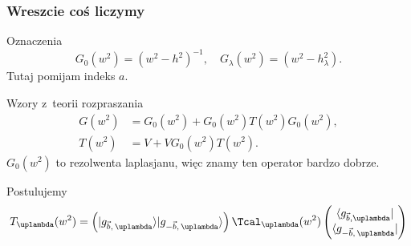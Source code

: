 \documentclass[10pt,t]{beamer}
\begin{document}
\begin{frame}
  \frametitle{Wreszcie coś liczymy}


  Oznaczenia
  \begin{equation}
    \label{eq:Efekt-Casimira-26}
    G_{ 0 }( w^{ 2 } ) = ( w^{ 2 } - h^{ 2 } )^{ -1 }, \quad
    G_{ \lambda }( w^{ 2 } ) = ( w^{ 2 } - h_{ \lambda }^{ 2 } ).
  \end{equation}
  Tutaj pomijam indeks $a$.


  Wzory z~teorii rozpraszania
  \begin{align}
    \label{eq:Efekt-Casimira-27-A}
    G( w^{ 2 } )
    &=
      G_{ 0 }( w^{ 2 } ) + G_{ 0 }( w^{ 2 } ) T( w^{ 2 } ) G_{ 0 }( w^{ 2 } ), \\
    \label{eq:Efekt-Casimira-27-B}
    T( w^{2 } ) &= V + V G_{ 0 }( w^{ 2 } ) T( w^{ 2 } ).
  \end{align}
  $G_{ 0 }( w^{ 2 } )$ to rezolwenta laplasjanu, więc znamy ten operator
  bardzo dobrze.

  Postulujemy
  \begin{equation}
    \label{eq:Efekt-Casimira-28}
    T_{ \lambda }( w^{ 2 } ) =
    \left( | g_{ \vecb,\, \lambda } \rangle | g_{ -\vecb,\, \lambda } \rangle \right)
    \Tcal_{ \lambda }( w^{ 2 } )
    \begin{pmatrix}
      \langle g_{ \vecb, \lambda } | \\
      \langle g_{ -\vecb,\, \lambda } |
    \end{pmatrix}
  \end{equation}

\end{frame}
\end{document}
